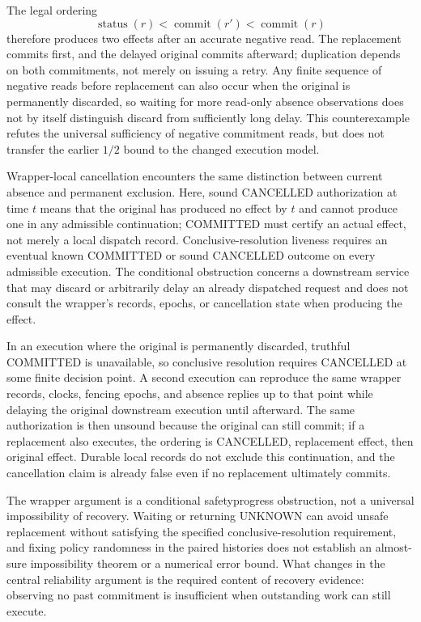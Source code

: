\documentclass[11pt]{article}
\begin{document}
The legal ordering \[\operatorname{status}(r)<\operatorname{commit}(r')<\operatorname{commit}(r)\] therefore produces two effects after an accurate negative read. The replacement commits first, and the delayed original commits afterward; duplication depends on both commitments, not merely on issuing a retry. Any finite sequence of negative reads before replacement can also occur when the original is permanently discarded, so waiting for more read-only absence observations does not by itself distinguish discard from sufficiently long delay. This counterexample refutes the universal sufficiency of negative commitment reads, but does not transfer the earlier $1/2$ bound to the changed execution model.

Wrapper-local cancellation encounters the same distinction between current absence and permanent exclusion. Here, sound CANCELLED authorization at time $t$ means that the original has produced no effect by $t$ and cannot produce one in any admissible continuation; COMMITTED must certify an actual effect, not merely a local dispatch record. Conclusive-resolution liveness requires an eventual known COMMITTED or sound CANCELLED outcome on every admissible execution. The conditional obstruction concerns a downstream service that may discard or arbitrarily delay an already dispatched request and does not consult the wrapper's records, epochs, or cancellation state when producing the effect.

In an execution where the original is permanently discarded, truthful COMMITTED is unavailable, so conclusive resolution requires CANCELLED at some finite decision point. A second execution can reproduce the same wrapper records, clocks, fencing epochs, and absence replies up to that point while delaying the original downstream execution until afterward. The same authorization is then unsound because the original can still commit; if a replacement also executes, the ordering is CANCELLED, replacement effect, then original effect. Durable local records do not exclude this continuation, and the cancellation claim is already false even if no replacement ultimately commits.

The wrapper argument is a conditional safety\textendash{}\allowbreak{}progress obstruction, not a universal impossibility of recovery. Waiting or returning UNKNOWN can avoid unsafe replacement without satisfying the specified conclusive-resolution requirement, and fixing policy randomness in the paired histories does not establish an almost-sure impossibility theorem or a numerical error bound. What changes in the central reliability argument is the required content of recovery evidence: observing no past commitment is insufficient when outstanding work can still execute.
\end{document}
